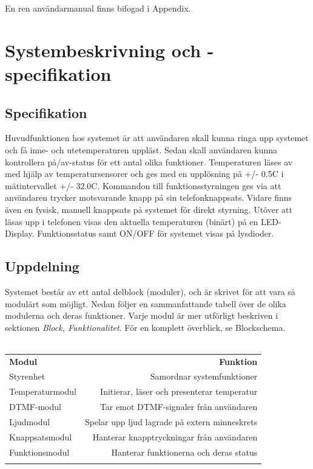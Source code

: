 \documentclass[a4paper,11pt]{article}
\begin{document}
	En ren användarmanual finns bifogad i Appendix.

\pagebreak

\section{Systembeskrivning och -specifikation}

	\subsection{Specifikation}

	Huvudfunktionen hos systemet är att användaren skall kunna ringa upp systemet och få inne- och utetemperaturen
	uppläst. Sedan skall användaren kunna kontrollera på/av-status för ett antal olika funktioner. Temperaturen
	läses av med hjälp av temperatursensorer och ges med en upplösning på +/- 0.5C i mätintervallet +/- 32.0C.
	Kommandon till funktionsstyrningen ges via att användaren trycker motsvarande knapp på sin telefonknappsats.
	Vidare finns även en fysisk, manuell knappsats på systemet för direkt styrning. Utöver att läsas upp i 
	telefonen visas den aktuella temperaturen (binärt) på en LED-Display. Funktionsstatus samt ON/OFF för systemet
	visas på lysdioder.

	\subsection{Uppdelning}

	Systemet består av ett antal delblock (moduler), och är skrivet för att vara så modulärt som möjligt.
	Nedan följer en sammanfattande tabell över de olika modulerna och deras funktioner. Varje modul är mer
	utförligt beskriven i sektionen {\it Block, Funktionalitet}. För en komplett överblick, se Blockschema. \\\\

	\begin{tabular}{l r}
		{\bf Modul} & {\bf Funktion}\\
	   	Styrenhet & Samordnar systemfunktioner\\
	  	Temperaturmodul & Initierar, läser och presenterar temperatur\\
	   	DTMF-modul & Tar emot DTMF-signaler från användaren\\
		Ljudmodul & Spelar upp ljud lagrade på extern minneskrets\\
		Knappsatsmodul & Hanterar knapptryckningar från användaren\\
		Funktionsmodul & Hanterar funktionerna och deras status\\\\
	\end{tabular}
\end{document}
